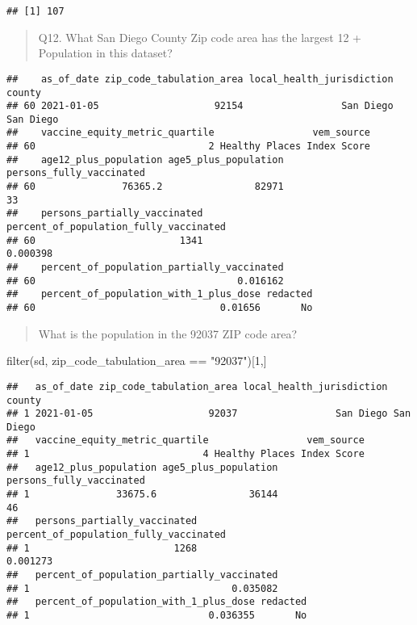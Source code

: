 \documentclass[
]{article}
\newenvironment{Shaded}{\begin{snugshade}}{\end{snugshade}}
\newcommand{\DecValTok}[1]{\textcolor[rgb]{0.00,0.00,0.81}{#1}}
\newcommand{\FunctionTok}[1]{\textcolor[rgb]{0.00,0.00,0.00}{#1}}
\newcommand{\NormalTok}[1]{#1}
\newcommand{\OtherTok}[1]{\textcolor[rgb]{0.56,0.35,0.01}{#1}}
\newcommand{\SpecialCharTok}[1]{\textcolor[rgb]{0.00,0.00,0.00}{#1}}
\newcommand{\StringTok}[1]{\textcolor[rgb]{0.31,0.60,0.02}{#1}}
\begin{document}
\begin{verbatim}
## [1] 107
\end{verbatim}

\begin{quote}
Q12. What San Diego County Zip code area has the largest 12 + Population
in this dataset?
\end{quote}

\begin{Shaded}
\end{Shaded}

\begin{verbatim}
##    as_of_date zip_code_tabulation_area local_health_jurisdiction    county
## 60 2021-01-05                    92154                 San Diego San Diego
##    vaccine_equity_metric_quartile                 vem_source
## 60                              2 Healthy Places Index Score
##    age12_plus_population age5_plus_population persons_fully_vaccinated
## 60               76365.2                82971                       33
##    persons_partially_vaccinated percent_of_population_fully_vaccinated
## 60                         1341                               0.000398
##    percent_of_population_partially_vaccinated
## 60                                   0.016162
##    percent_of_population_with_1_plus_dose redacted
## 60                                0.01656       No
\end{verbatim}

\begin{quote}
What is the population in the 92037 ZIP code area?
\end{quote}

\begin{Shaded}
\begin{Highlighting}[]
\FunctionTok{filter}\NormalTok{(sd, zip\_code\_tabulation\_area }\SpecialCharTok{==} \StringTok{"92037"}\NormalTok{)[}\DecValTok{1}\NormalTok{,]}
\end{Highlighting}
\end{Shaded}

\begin{verbatim}
##   as_of_date zip_code_tabulation_area local_health_jurisdiction    county
## 1 2021-01-05                    92037                 San Diego San Diego
##   vaccine_equity_metric_quartile                 vem_source
## 1                              4 Healthy Places Index Score
##   age12_plus_population age5_plus_population persons_fully_vaccinated
## 1               33675.6                36144                       46
##   persons_partially_vaccinated percent_of_population_fully_vaccinated
## 1                         1268                               0.001273
##   percent_of_population_partially_vaccinated
## 1                                   0.035082
##   percent_of_population_with_1_plus_dose redacted
## 1                               0.036355       No
\end{verbatim}
\end{document}

